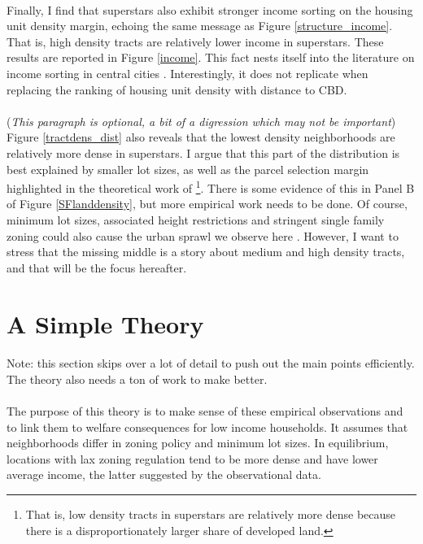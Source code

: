 \documentclass[]{article}
\theoremstyle{plain}
\begin{document}
\paragraph*{}
Finally, I find that superstars also exhibit stronger income sorting on the housing unit density margin, echoing the same message as Figure \ref{structure_income}. That is, high density tracts are relatively lower income in superstars. These results are reported in Figure \ref{income}. This fact nests itself into the literature on income sorting in central cities \citep{parispoor} \citep{ccpoortransport}. Interestingly, it does not replicate when replacing the ranking of housing unit density with distance to CBD. 

\paragraph*{}
 (\textit{This paragraph is optional, a bit of a digression which may not be important}) Figure \ref{tractdens_dist} also reveals that the lowest density neighborhoods are relatively more dense in superstars. I argue that this part of the distribution is best explained by smaller lot sizes, as well as the parcel selection margin highlighted in the theoretical work of \cite{BSH}\footnote{That is, low density tracts in superstars are relatively more dense because there is a disproportionately larger share of developed land.}. There is some evidence of this in Panel B of Figure \ref{SFlanddensity}, but more empirical work needs to be done. Of course, minimum lot sizes, associated height restrictions and stringent single family zoning could also cause the urban sprawl we observe here \citep{spatialSizeofUSUrbAreas} \citep{bbheight}. However, I want to stress that the missing middle is a story about medium and high density tracts, and that will be the focus hereafter.
 
\section{A Simple Theory}

\paragraph*{}
Note: this section skips over a lot of detail to push out the main points efficiently. The theory also needs a ton of work to make better. 
\paragraph*{}
The purpose of this theory is to make sense of these empirical observations and to link them to welfare consequences for low income households. It assumes that neighborhoods differ in zoning policy and minimum lot sizes. In equilibrium, locations with lax zoning regulation tend to be more dense and have lower average income, the latter suggested by the observational data. 
\end{document}
